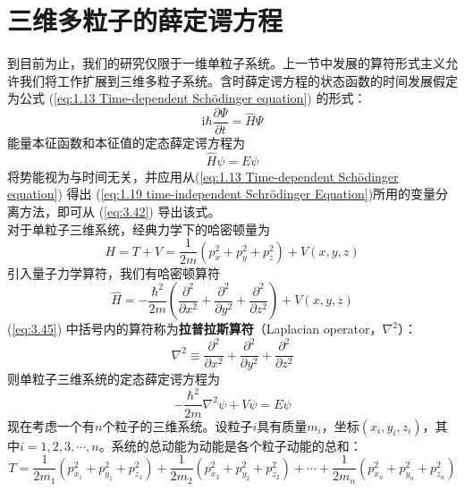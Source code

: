 \section{三维多粒子的薛定谔方程}
\label{sec:3.4 The Three-Dimensional, Many-Particle Schrödinger Equation}
	到目前为止，我们的研究仅限于一维单粒子系统。上一节中发展的算符形式主义允许我们将工作扩展到三维多粒子系统。含时薛定谔方程的状态函数的时间发展假定为公式 (\ref{eq:1.13 Time-dependent Schödinger equation}) 的形式：
	\begin{equation}
		\boxed{
			\mathrm{i}\hbar\frac{\partial \Psi}{\partial t} = \hat{H}\Psi
		}
		\label{eq:3.42}
	\end{equation}
	能量本征函数和本征值的定态薛定谔方程为
	\begin{equation}
		\boxed{
			\hat{H}\psi = E\psi
		}
		\label{eq:3.43}
	\end{equation}
	将势能视为与时间无关，并应用从(\ref{eq:1.13 Time-dependent Schödinger equation}) 得出 (\ref{eq:1.19 time-independent Schrödinger Equation})所用的变量分离方法，即可从 (\ref{eq:3.42}) 导出该式。\\
	\indent 对于单粒子三维系统，经典力学下的哈密顿量为
	\begin{equation}
		H = T + V = \frac{1}{2m}\left(p_x^2+p_y^2+p_z^2\right)+V\left(x,y,z\right)
		\label{eq:3.44}
	\end{equation}
	引入量子力学算符，我们有哈密顿算符
	\begin{equation}
		\hat{H} = -\frac{\hbar^2}{2m}\left(\frac{\partial^2}{\partial x^2}+\frac{\partial^2}{\partial y^2}+\frac{\partial^2}{\partial z^2}\right)+V\left(x,y,z\right)
		\label{eq:3.45}
	\end{equation}
	(\ref{eq:3.45}) 中括号内的算符称为\textbf{拉普拉斯算符}（Laplacian operator，$\nabla^2$）：
	\begin{equation}
		\boxed{
			\nabla^2 \equiv \frac{\partial^2}{\partial x^2} + \frac{\partial^2}{\partial y^2} + \frac{\partial^2}{\partial z^2}
		}
		\label{eq:3.46}
	\end{equation}
	则单粒子三维系统的定态薛定谔方程为
	\begin{equation}
		-\frac{\hbar^2}{2m}\nabla^2\psi + V\psi = E\psi
		\label{eq:3.47}
	\end{equation}
	\indent 现在考虑一个有$n$个粒子的三维系统。设粒子$i$具有质量$m_i$，坐标$\left(x_i,y_i,z_i\right)$，其中$i = 1,2,3,\cdots,n$。系统的总动能为动能是各个粒子动能的总和：
	\begin{equation*}
		T = \frac{1}{2m_1}\left(p_{x_1}^2+p_{y_z}^2+p_{z_1}^2\right) + \frac{1}{2m_2}\left(p_{x_2}^2+p_{y_2}^2+p_{z_2}^2\right) + \cdots + \frac{1}{2m_n}\left(p_{x_n}^2+p_{y_n}^2+p_{z_n}^2\right)
	\end{equation*}
